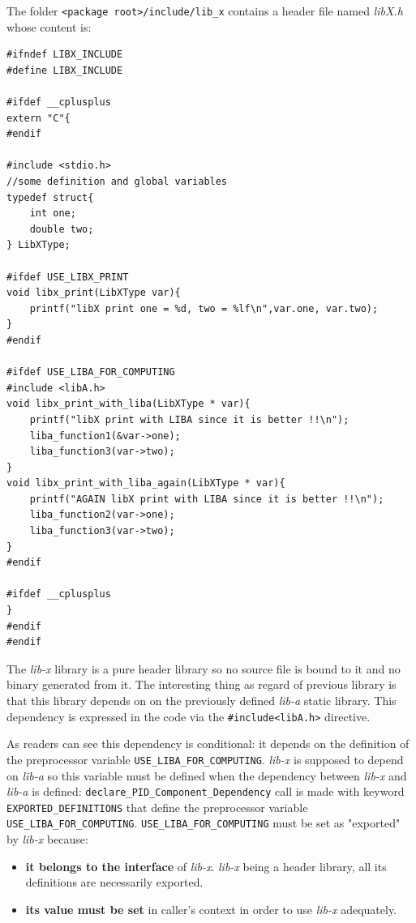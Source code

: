 \documentclass[12pt,a4paper]{article}
\begin{document}
The folder \texttt{<package root>/include/lib\_x} contains a header file named \textit{libX.h} whose content is: 
\begin{verbatim}
#ifndef LIBX_INCLUDE
#define LIBX_INCLUDE

#ifdef __cplusplus
extern "C"{
#endif

#include <stdio.h>
//some definition and global variables
typedef struct{
	int one;
	double two; 
} LibXType;

#ifdef USE_LIBX_PRINT 
void libx_print(LibXType var){
	printf("libX print one = %d, two = %lf\n",var.one, var.two);
}
#endif

#ifdef USE_LIBA_FOR_COMPUTING
#include <libA.h>
void libx_print_with_liba(LibXType * var){
	printf("libX print with LIBA since it is better !!\n");
	liba_function1(&var->one);
	liba_function3(var->two);
}
void libx_print_with_liba_again(LibXType * var){
	printf("AGAIN libX print with LIBA since it is better !!\n");
	liba_function2(var->one);
	liba_function3(var->two);
}
#endif

#ifdef __cplusplus
}
#endif
#endif
\end{verbatim}

The \textit{lib-x} library is a pure header library so no source file is bound to it and no binary generated from it. The interesting thing as regard of previous library is that this library depends on on the previously defined \textit{lib-a} static library. This dependency is expressed in the code via the \texttt{\#include<libA.h>} directive.

As readers can see this dependency is conditional: it depends on the definition of the preprocessor variable \texttt{USE\_LIBA\_FOR\_COMPUTING}. \textit{lib-x} is supposed to depend on \textit{lib-a} so this variable must be defined when the dependency between \textit{lib-x} and \textit{lib-a} is defined: \texttt{declare\_PID\_Component\_Dependency} call is made with keyword \texttt{EXPORTED\_DEFINITIONS} that define the preprocessor variable \texttt{USE\_LIBA\_FOR\_COMPUTING}. \texttt{USE\_LIBA\_FOR\_COMPUTING} must be set as "exported" by \textit{lib-x} because:
\begin{itemize}
\item \textbf{it belongs to the interface} of \textit{lib-x}. \textit{lib-x} being a header library, all its definitions are necessarily exported.
\item \textbf{its value must be set} in caller's context in order to use \textit{lib-x} adequately.
\end{itemize}
\end{document}
